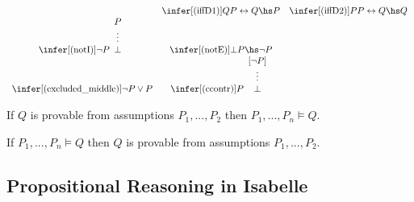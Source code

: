 \documentclass{article}
\begin{document}
\begin{definition}
\begin{align*}
\begin{array}{c c c}
{\begin{array}[b]{c}
				                                                        \end{array}} &
			\infer[(\text{iffD1})]{Q}{P\leftrightarrow Q\hs P}            &
			\infer[(\text{iffD2})]{P}{P\leftrightarrow Q\hs Q}                         \\
			\infer[(\text{notI})]{\neg P}{\begin{array}[b]{c}
					                              P \\ \vdots \\ \bot
				                              \end{array}}             &
			\infer[(\text{notE})]{\bot}{P\hs\neg P}                       &            \\
			\infer[(\text{excluded\_middle})]{\neg P \vee P}{}            &
			\infer[\text{(ccontr)}]{P}{\begin{array}[b]{c}
					                           [\neg P] \\ \vdots \\ \bot
				                           \end{array}}
		\end{array}
	\end{align*}
\end{definition}

\begin{theorem}[Soundness]
	If $Q$ is provable from assumptions $P_1,...,P_2$ then $P_1,...,P_n\vDash Q$.
\end{theorem}
\begin{theorem}[Completeness]
	If $P_1,...,P_n\vDash Q$ then $Q$ is provable from assumptions $P_1,...,P_2$.
\end{theorem}

\subsection{Propositional Reasoning in Isabelle}

\newcommand{\db}[1]{[\![#1]\!]}
\end{document}
